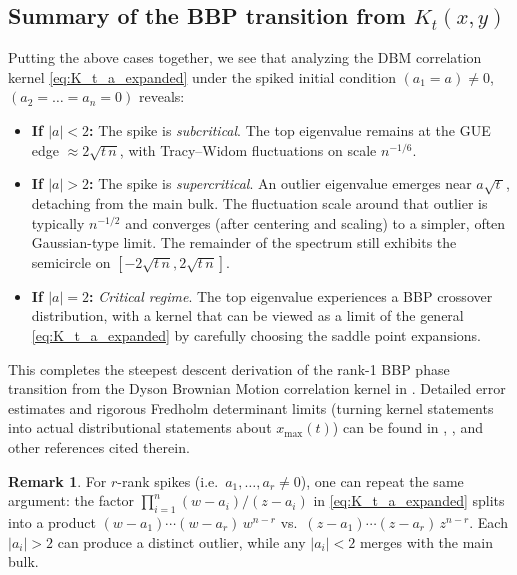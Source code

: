 \documentclass[letterpaper,11pt,oneside,reqno]{article}
\numberwithin{equation}{section}
\theoremstyle{definition}
\newtheorem{remark}[proposition]{Remark}
\begin{document}
\subsection{Summary of the BBP transition from \texorpdfstring{$K_t(x,y)$}{Kt(x,y)}}

Putting the above cases together, we see that analyzing the DBM correlation kernel 
\eqref{eq:K_t_a_expanded} under the spiked initial condition $(a_1=a)\neq0$, $(a_2=\dots=a_n=0)$ 
reveals:

\begin{itemize}
\item \textbf{If $|a|<2$:} 
  The spike is \emph{subcritical}.  The top eigenvalue remains at the GUE edge $\approx 2\sqrt{t\,n}$, with Tracy--Widom fluctuations on scale $n^{-1/6}$.  

\item \textbf{If $|a|>2$:} 
  The spike is \emph{supercritical}.  An outlier eigenvalue emerges near $a\sqrt{t\,}$, detaching from the main bulk.  The fluctuation scale around that outlier is typically $n^{-1/2}$ and converges (after centering and scaling) to a simpler, often Gaussian-type limit.  The remainder of the spectrum still exhibits the semicircle on $[-2\sqrt{t\,n},2\sqrt{t\,n}]$.  

\item \textbf{If $|a|=2$:} 
  \emph{Critical regime}.  The top eigenvalue experiences a BBP crossover distribution, with a kernel that can be viewed as a limit of the general \eqref{eq:K_t_a_expanded} by carefully choosing the saddle point expansions.  
\end{itemize}

This completes the steepest descent derivation of the rank-1 BBP phase transition from the Dyson Brownian Motion correlation kernel in .  Detailed error estimates and rigorous Fredholm determinant limits (turning kernel statements into actual distributional statements about $x_{\max}(t)$) can be found in \cite{BBP2005phase}, \cite{BloemendalVirag}, and other references cited therein.

\begin{remark}
For $r$-rank spikes (i.e.\ $a_1,\dots,a_r\neq0$), one can repeat the same argument: the factor 
$\prod_{i=1}^n (w-a_i)/(z-a_i)$ 
in \eqref{eq:K_t_a_expanded} splits into a product $(w-a_1)\cdots(w-a_r)\,w^{n-r}$ vs.\ $(z-a_1)\cdots(z-a_r)\,z^{n-r}$.  
Each $|a_i|>2$ can produce a distinct outlier, while any $|a_i|<2$ merges with the main bulk.  
\end{remark}
\end{document}
